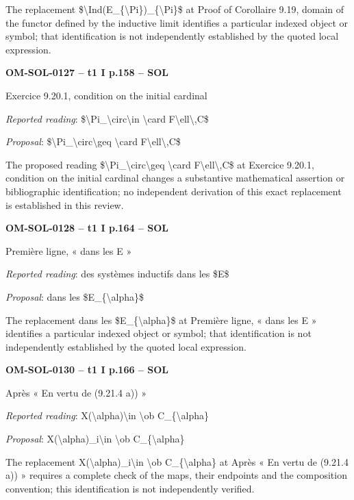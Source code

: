 The replacement \$\textbackslash{}Ind(E\_\{\textbackslash{}Pi\})\_\{\textbackslash{}Pi\}\$ at Proof of Corollaire 9.19, domain of the functor defined by the inductive limit identifies a particular indexed object or symbol; that identification is not independently established by the quoted local expression.\par
\par\noindent\textbf{OM-SOL-0127 -- t1 I p.158 -- SOL}\par
Exercice 9.20.1, condition on the initial cardinal\par
\emph{Reported reading}: \$\textbackslash{}Pi\_\textbackslash{}circ\textbackslash{}in \textbackslash{}card F\textbackslash{}ell\textbackslash{},C\$\par
\emph{Proposal}: \$\textbackslash{}Pi\_\textbackslash{}circ\textbackslash{}geq \textbackslash{}card F\textbackslash{}ell\textbackslash{},C\$\par
The proposed reading \$\textbackslash{}Pi\_\textbackslash{}circ\textbackslash{}geq \textbackslash{}card F\textbackslash{}ell\textbackslash{},C\$ at Exercice 9.20.1, condition on the initial cardinal changes a substantive mathematical assertion or bibliographic identification; no independent derivation of this exact replacement is established in this review.\par
\par\noindent\textbf{OM-SOL-0128 -- t1 I p.164 -- SOL}\par
Première ligne, « dans les E »\par
\emph{Reported reading}: des systèmes inductifs dans les \$E\$\par
\emph{Proposal}: dans les \$E\_\{\textbackslash{}alpha\}\$\par
The replacement dans les \$E\_\{\textbackslash{}alpha\}\$ at Première ligne, « dans les E » identifies a particular indexed object or symbol; that identification is not independently established by the quoted local expression.\par
\par\noindent\textbf{OM-SOL-0130 -- t1 I p.166 -- SOL}\par
Après « En vertu de (9.21.4 a)) »\par
\emph{Reported reading}: X(\textbackslash{}alpha)\textbackslash{}in \textbackslash{}ob C\_\{\textbackslash{}alpha\}\par
\emph{Proposal}: X(\textbackslash{}alpha)\_i\textbackslash{}in \textbackslash{}ob C\_\{\textbackslash{}alpha\}\par
The replacement X(\textbackslash{}alpha)\_i\textbackslash{}in \textbackslash{}ob C\_\{\textbackslash{}alpha\} at Après « En vertu de (9.21.4 a)) » requires a complete check of the maps, their endpoints and the composition convention; this identification is not independently verified.\par
